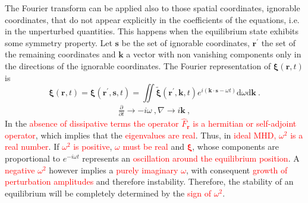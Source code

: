 \documentclass[12pt,a4paper]{article}
\renewcommand{\vec}[1]{\boldsymbol{#1}}
\newcommand{\dif}{\mathrm{d}}
\begin{document}
The Fourier transform can be applied also to those spatial coordinates, ignorable coordinates, that do not appear explicitly in the coefficients of the equations, i.e. in the unperturbed quantities. This happens when the equilibrium state exhibits some symmetry property. Let $\vec{s}$ be the set of ignorable coordinates, $\vec{r}^\prime$ the set of the remaining coordinates and $\vec{k}$ a vector with non vanishing components only in the directions of the ignorable coordinates. The Fourier representation of $\vec{\xi}(\vec{r}, t)$ is
\begin{equation}
\vec{\xi}(\vec{r}, t) = \vec{\xi}(\vec{r}^\prime, \vec{s}, t) = \iint \tilde{\vec{\xi}}(\vec{r}^\prime, \vec{k}, t) e^{i(\vec{k}\cdot \vec{s} -\omega t)} \dif \omega \dif \vec{k} ~.
\end{equation}
\begin{align*}
\frac{\partial }{\partial t} \rightarrow -i \omega ~, \nabla \rightarrow i\vec{k} ~,
\end{align*}
In the \textcolor{red}{absence of dissipative terms the operator $\hat{F}_{\vec{r}}$ is a hermitian or self-adjoint operator}, which implies that the \textcolor{red}{eigenvalues are real}. Thus, in \textcolor{red}{ideal MHD, $\omega^2$ is a real number}. If \textcolor{red}{$\omega^2$ is positive}, \textcolor{red}{$\omega$ must be real} and \textcolor{red}{$\vec{\xi}$}, whose components are proportional to $e^{-i\omega t}$ represents an \textcolor{red}{oscillation around the equilibrium position}. A \textcolor{red}{negative $\omega^2$} however implies a \textcolor{red}{purely imaginary $\omega$}, with consequent \textcolor{red}{growth of perturbation amplitudes} and therefore instability. Therefore, the stability of an equilibrium will be completely determined by the \textcolor{red}{sign of $\omega^2$}.
\end{document}
